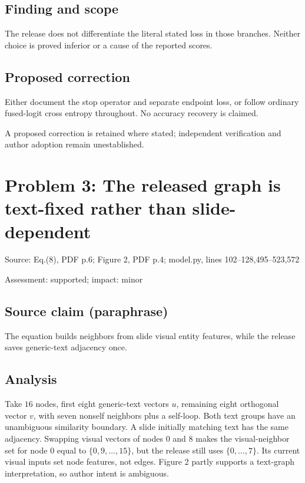 \documentclass[11pt]{article}
\begin{document}
\subsection*{Finding and scope}

The release does not differentiate the literal stated loss in those branches. Neither choice is proved inferior or a cause of the reported scores.

\subsection*{Proposed correction}

Either document the stop operator and separate endpoint loss, or follow ordinary fused-logit cross entropy throughout. No accuracy recovery is claimed.

A proposed correction is retained where stated; independent verification and author adoption remain unestablished.

\section*{Problem 3: The released graph is text-fixed rather than slide-dependent}

Source: Eq.(8), PDF p.6; Figure 2, PDF p.4; model.py, lines 102–128,495–523,572

Assessment: supported; impact: minor

\subsection*{Source claim (paraphrase)}

The equation builds neighbors from slide visual entity features, while the release saves generic-text adjacency once.

\subsection*{Analysis}

Take \(16\) nodes, first eight generic-text vectors \(u\), remaining eight orthogonal vector \(v\), with seven nonself neighbors plus a self-loop. Both text groups have an unambiguous similarity boundary. A slide initially matching text has the same adjacency. Swapping visual vectors of nodes \(0\) and \(8\) makes the visual-neighbor set for node \(0\) equal to \(\{0,9,\ldots,15\}\), but the release still uses \(\{0,\ldots,7\}\). Its current visual inputs set node features, not edges. Figure 2 partly supports a text-graph interpretation, so author intent is ambiguous.
\end{document}
